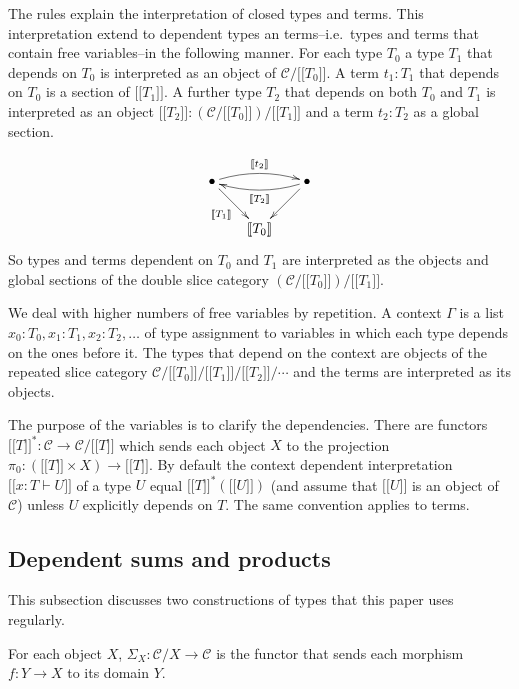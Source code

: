 \documentclass{tac}
\newcommand\hide[1]{}
\newcommand\cat\mathcal
\newcommand\ri{^*}
\newcommand\of{:}
\newcommand\db[1]{{[\![}#1{]\!]}}
\newcommand\dsum{\Sigma_}
\begin{document}
The rules explain the interpretation of closed types and terms. This interpretation extend to dependent types an terms--i.e.\ types and terms that contain free variables--in the following manner. For each type $T_0$ a type $T_1$ that depends on $T_0$ is interpreted as an object of $\cat C/\db{T_0}$. A term $t_1\of T_1$ that depends on $T_0$ is a section of $\db{T_1}$. A further type $T_2$ that depends on both $T_0$ and $T_1$ is interpreted as an object $\db{T_2}\of(\cat C/\db{T_0})/\db{T_1}$ and a term $t_2\of T_2$ as a global section.
\hide{\[\xymatrix{
& \bullet\ar[dl]^{\db{T_2}}\ar[d]\\ 
\bullet\ar[r]_{\db{T_1}}\ar@/^/[ur]^{\db{t_2}} & \db{T_0}
}\]}
\[\xy
(0,12)*+{\bullet} = "top left",(24,12)*+{\bullet} = "top right",(12,0)*+{\db{T_0}} = "bottom"
\ar "top right";"bottom" \ar_{\db{T_1}} "top left";"bottom" 
\ar@/^/@{->}^{\db{T_2}} "top right";"top left"
\ar@/^/@{->}^{\db{t_2}} "top left";"top right"
\endxy\]
So types and terms dependent on $T_0$ and $T_1$ are interpreted as the objects and global sections of the double slice category $(\cat C/\db{T_0})/\db{T_1}$.

We deal with higher numbers of free variables by repetition. A context $\Gamma$ is a list $x_0\of T_0,x_1\of T_1,x_2\of T_2,\dots$ of type assignment to variables in which each type depends on the ones before it. The types that depend on the context are objects of the repeated slice category $\cat C/\db{T_0}/\db{T_1}/\db{T_2}/\dotsm$ and the terms are interpreted as its objects. 

The purpose of the variables is to clarify the dependencies. There are functors $\db T\ri\of\cat C\to \cat C/\db T$ which sends each object $X$ to the projection $\pi_0\of(\db T\times X)\to \db T$. By default the context dependent interpretation $\db{x\of T\vdash U}$ of a type $U$ equal $\db T\ri(\db U)$ (and assume that $\db U$ is an object of $\cat C$) unless $U$ explicitly depends on $T$. The same convention applies to terms.

\subsection{Dependent sums and products}
This subsection discusses two constructions of types that this paper uses regularly.


For each object $X$, $\dsum X\of\cat C/X\to \cat C$ is the functor that sends each morphism $f\of Y\to X$ to its domain $Y$.
\end{document}

